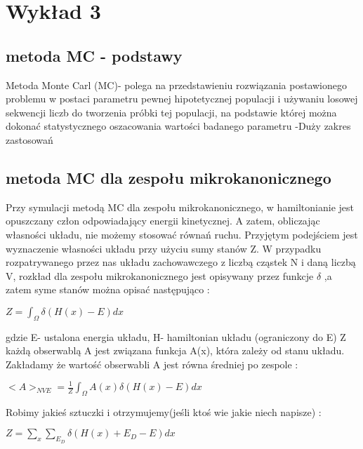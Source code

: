 \documentclass{article}
\begin{document}
		\section{Wykład 3}
		\subsection{metoda MC - podstawy}
		Metoda Monte Carl (MC)- polega na przedstawieniu rozwiązania postawionego problemu w postaci parametru pewnej hipotetycznej populacji i używaniu losowej sekwencji liczb do tworzenia próbki tej populacji, na podstawie której można dokonać statystycznego oszacowania wartości badanego parametru\newline
		-Duży zakres zastosowań
		
		\subsection{metoda MC dla zespołu mikrokanonicznego}
		Przy symulacji metodą MC dla zespołu mikrokanonicznego, w hamiltonianie jest opuszczany człon odpowiadający energii kinetycznej. A zatem, obliczając własności układu, nie możemy stosować równań ruchu. Przyjętym podejściem jest wyznaczenie własności układu przy użyciu sumy stanów Z. W przypadku rozpatrywanego przez nas układu zachowawczego z liczbą cząstek N i daną liczbą V, rozkład dla zespołu mikrokanonicznego jest opisywany przez funkcje $\delta$ ,a zatem syme stanów można opisać następująco :\newline
		\begin{center}
			$Z=	\int_{\Omega}^{} \delta (H(x)-E)dx$
		\end{center}
		gdzie E- ustalona energia układu, H- hamiltonian układu (ograniczony do E)
		Z każdą obserwablą A jest związana funkcja A(x), która zależy od stanu układu. Zakładamy że wartość obserwabli A jest równa średniej po zespole :
		\begin{center}
			$<A>_{NVE}=\frac{1}{Z}\int_{\Omega}^{} A(x)\delta(H(x)-E)dx$\newline
		\end{center}
		Robimy jakieś sztuczki i otrzymujemy(jeśli ktoś wie jakie niech napisze) :
		\begin{center}
			$Z=\sum_{x} \sum_{E_{D}} \delta(H(x)+E_{D}-E)dx$\newline
		\end{center}
		
\end{document}
